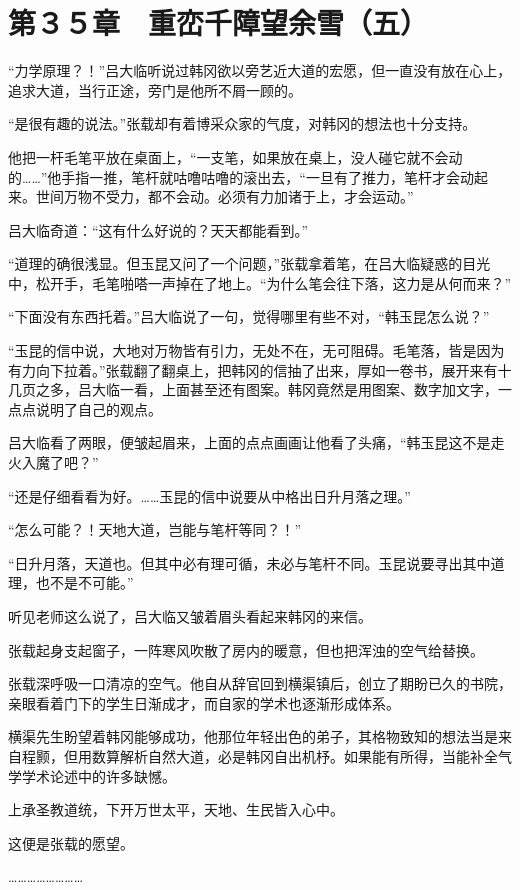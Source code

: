 \section{第３５章　重峦千障望余雪（五）}

“力学原理？！”吕大临听说过韩冈欲以旁艺近大道的宏愿，但一直没有放在心上，追求大道，当行正途，旁门是他所不屑一顾的。

“是很有趣的说法。”张载却有着博采众家的气度，对韩冈的想法也十分支持。

他把一杆毛笔平放在桌面上，“一支笔，如果放在桌上，没人碰它就不会动的……”他手指一推，笔杆就咕噜咕噜的滚出去，“一旦有了推力，笔杆才会动起来。世间万物不受力，都不会动。必须有力加诸于上，才会运动。”

吕大临奇道：“这有什么好说的？天天都能看到。”

“道理的确很浅显。但玉昆又问了一个问题，”张载拿着笔，在吕大临疑惑的目光中，松开手，毛笔啪嗒一声掉在了地上。“为什么笔会往下落，这力是从何而来？”

“下面没有东西托着。”吕大临说了一句，觉得哪里有些不对，“韩玉昆怎么说？”

“玉昆的信中说，大地对万物皆有引力，无处不在，无可阻碍。毛笔落，皆是因为有力向下拉着。”张载翻了翻桌上，把韩冈的信抽了出来，厚如一卷书，展开来有十几页之多，吕大临一看，上面甚至还有图案。韩冈竟然是用图案、数字加文字，一点点说明了自己的观点。

吕大临看了两眼，便皱起眉来，上面的点点画画让他看了头痛，“韩玉昆这不是走火入魔了吧？”

“还是仔细看看为好。……玉昆的信中说要从中格出日升月落之理。”

“怎么可能？！天地大道，岂能与笔杆等同？！”

“日升月落，天道也。但其中必有理可循，未必与笔杆不同。玉昆说要寻出其中道理，也不是不可能。”

听见老师这么说了，吕大临又皱着眉头看起来韩冈的来信。

张载起身支起窗子，一阵寒风吹散了房内的暖意，但也把浑浊的空气给替换。

张载深呼吸一口清凉的空气。他自从辞官回到横渠镇后，创立了期盼已久的书院，亲眼看着门下的学生日渐成才，而自家的学术也逐渐形成体系。

横渠先生盼望着韩冈能够成功，他那位年轻出色的弟子，其格物致知的想法当是来自程颢，但用数算解析自然大道，必是韩冈自出机杼。如果能有所得，当能补全气学学术论述中的许多缺憾。

上承圣教道统，下开万世太平，天地、生民皆入心中。

这便是张载的愿望。

……………………

